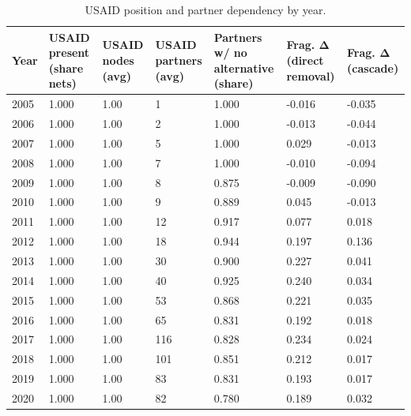 \begin{table}[!ht]
\centering
\caption{USAID position and partner dependency by year.}
\label{tab:usaid_dependency_by_year}
\begin{tabular}{lllllll}
\toprule
Year & USAID present (share nets) & USAID nodes (avg) & USAID partners (avg) & Partners w/ no alternative (share) & Frag. Δ (direct removal) & Frag. Δ (cascade)\\
\midrule
2005 & 1.000 & 1.00 & 1 & 1.000 & -0.016 & -0.035\\
2006 & 1.000 & 1.00 & 2 & 1.000 & -0.013 & -0.044\\
2007 & 1.000 & 1.00 & 5 & 1.000 & 0.029 & -0.013\\
2008 & 1.000 & 1.00 & 7 & 1.000 & -0.010 & -0.094\\
2009 & 1.000 & 1.00 & 8 & 0.875 & -0.009 & -0.090\\
2010 & 1.000 & 1.00 & 9 & 0.889 & 0.045 & -0.013\\
2011 & 1.000 & 1.00 & 12 & 0.917 & 0.077 & 0.018\\
2012 & 1.000 & 1.00 & 18 & 0.944 & 0.197 & 0.136\\
2013 & 1.000 & 1.00 & 30 & 0.900 & 0.227 & 0.041\\
2014 & 1.000 & 1.00 & 40 & 0.925 & 0.240 & 0.034\\
2015 & 1.000 & 1.00 & 53 & 0.868 & 0.221 & 0.035\\
2016 & 1.000 & 1.00 & 65 & 0.831 & 0.192 & 0.018\\
2017 & 1.000 & 1.00 & 116 & 0.828 & 0.234 & 0.024\\
2018 & 1.000 & 1.00 & 101 & 0.851 & 0.212 & 0.017\\
2019 & 1.000 & 1.00 & 83 & 0.831 & 0.193 & 0.017\\
2020 & 1.000 & 1.00 & 82 & 0.780 & 0.189 & 0.032\\
\bottomrule
\end{tabular}
\end{table}
